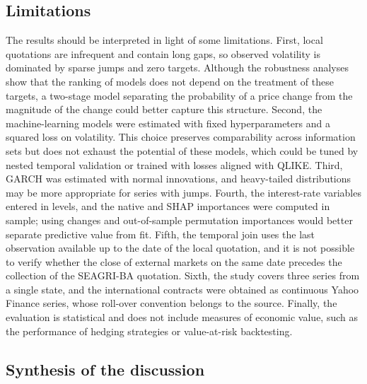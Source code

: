 \documentclass[a4paper,fleqn]{cas-sc}
\begin{document}
\subsection{Limitations}
\label{subsec:disc_limitations}

The results should be interpreted in light of some limitations. First, local quotations are infrequent and contain long gaps, so observed volatility is dominated by sparse jumps and zero targets. Although the robustness analyses show that the ranking of models does not depend on the treatment of these targets, a two-stage model separating the probability of a price change from the magnitude of the change could better capture this structure. Second, the machine-learning models were estimated with fixed hyperparameters and a squared loss on volatility. This choice preserves comparability across information sets but does not exhaust the potential of these models, which could be tuned by nested temporal validation or trained with losses aligned with QLIKE. Third, GARCH was estimated with normal innovations, and heavy-tailed distributions may be more appropriate for series with jumps. Fourth, the interest-rate variables entered in levels, and the native and SHAP importances were computed in sample; using changes and out-of-sample permutation importances would better separate predictive value from fit. Fifth, the temporal join uses the last observation available up to the date of the local quotation, and it is not possible to verify whether the close of external markets on the same date precedes the collection of the SEAGRI-BA quotation. Sixth, the study covers three series from a single state, and the international contracts were obtained as continuous Yahoo Finance series, whose roll-over convention belongs to the source. Finally, the evaluation is statistical and does not include measures of economic value, such as the performance of hedging strategies or value-at-risk backtesting.

\subsection{Synthesis of the discussion}
\end{document}
